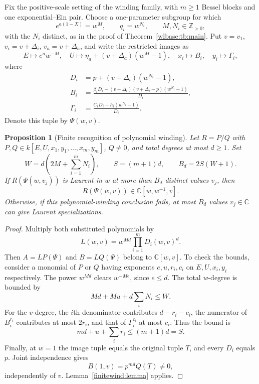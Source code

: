 \documentclass[11pt,a4paper]{article}
\newtheorem{proposition}[theorem]{Proposition}
\theoremstyle{definition}\newtheorem{definition}[theorem]{Definition}
\theoremstyle{remark}\newtheorem{remark}[theorem]{Remark}
\begin{document}
Fix the positive-scale setting of the winding family, with $m\ge1$
Bessel blocks and one exponential--Ein pair. Choose a one-parameter
subgroup for which
\[
 e^{a(1-X)}=w^M,\qquad q_i=w^{N_i},\qquad M,N_i\in\mathbb Z_{>0},
\]
with the $N_i$ distinct, as in the proof of
Theorem~\ref{wlbase:tb:main}. Put $v=v_1$, $v_i=v+\Delta_i$,
$v_a=v+\Delta_a$, and write the restricted images as
\[
 E\longmapsto e^aw^{-M},\quad
 U\longmapsto\eta_a+(v+\Delta_a)(w^M-1),\quad
 x_i\longmapsto B_i,\quad y_i\longmapsto\Gamma_i,
\]
where
\begin{align*}
 D_i&=p+(v+\Delta_i)(w^{N_i}-1),\\
 B_i&=\frac{\beta_iD_i-(v+\Delta_i)(v+\Delta_i-p)
                         (w^{N_i}-1)}{D_i},\\
 \Gamma_i&=\frac{C_iD_i-h_i(w^{N_i}-1)}{D_i}.
\end{align*}
Denote this tuple by $\Psi(w,v)$.

\begin{proposition}[Finite recognition of polynomial winding]
\label{finitewind:general}
Let $R=P/Q$ with $P,Q\in k[E,U,x_1,y_1,\ldots,x_m,y_m]$,
$Q\ne0$, and total degrees at most $d\ge1$. Set
\[
 W=d\left(2M+\sum_{i=1}^mN_i\right),\qquad S=(m+1)d,
 \qquad B_d=2S(W+1).
\]
If $R(\Psi(w,v_j))$ is Laurent in $w$ at more than $B_d$ distinct
values $v_j$, then
\[
 R(\Psi(w,v))\in\mathbb C[w,w^{-1},v].
\]
Otherwise, if this polynomial-winding conclusion fails, at most $B_d$
values $v_j\in\mathbb C$ can give Laurent specializations.
\end{proposition}

\begin{proof}
Multiply both substituted polynomials by
\[
 L(w,v)=w^{Md}\prod_{i=1}^mD_i(w,v)^d.
\]
Then $A=LP(\Psi)$ and $B=LQ(\Psi)$ belong to
$\mathbb C[w,v]$. To check the bounds, consider a monomial of $P$ or
$Q$ having exponents $e,u,r_i,c_i$ on $E,U,x_i,y_i$ respectively.
The power $w^{Md}$ clears $w^{-Me}$, since $e\le d$.
The total $w$-degree is bounded by
\[
 Md+Mu+d\sum_iN_i\le W.
\]
For the $v$-degree, the $i$th denominator contributes
$d-r_i-c_i$, the numerator of $B_i^{r_i}$ contributes at most $2r_i$,
and that of $\Gamma_i^{c_i}$ at most $c_i$. Thus the bound is
\[
 md+u+\sum_ir_i\le(m+1)d=S.
\]
Finally, at $w=1$ the image tuple equals the original tuple $T$,
and every $D_i$ equals $p$. Joint independence gives
\[
 B(1,v)=p^{md}Q(T)\ne0,
\]
independently of $v$. Lemma~\ref{finitewind:lemma} applies.
\end{proof}
\end{document}
